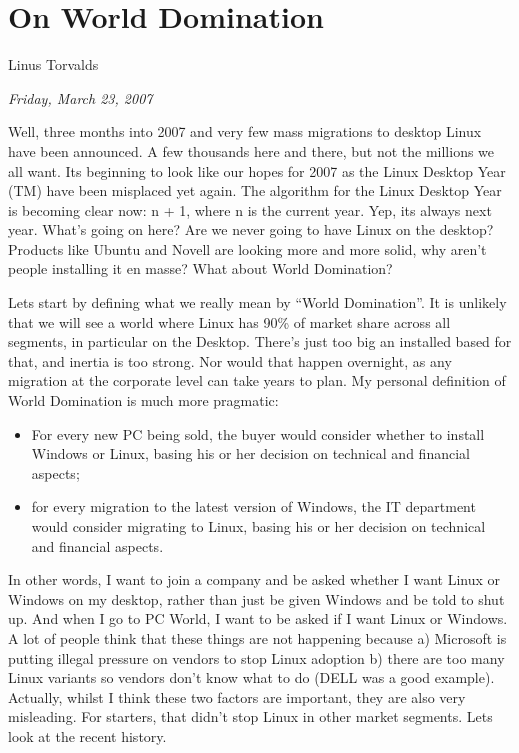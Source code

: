 \documentclass{memoir}
\begin{document}
\chapter{On World Domination}

\begin{epigraphs}
      {Linus Torvalds}
\end{epigraphs}

\begin{flushright}
  \emph{Friday, March 23, 2007 }
\end{flushright}

Well, three months into 2007 and very few mass migrations to desktop
Linux have been announced. A few thousands here and there, but not the
millions we all want. Its beginning to look like our hopes for 2007 as
the Linux Desktop Year (TM) have been misplaced yet again. The
algorithm for the Linux Desktop Year is becoming clear now: n + 1,
where n is the current year. Yep, its always next year. What's going
on here? Are we never going to have Linux on the desktop? Products
like Ubuntu and Novell are looking more and more solid, why aren't
people installing it en masse? What about World Domination?

Lets start by defining what we really mean by ``World Domination''. It
is unlikely that we will see a world where Linux has 90\% of market
share across all segments, in particular on the Desktop. There's just
too big an installed based for that, and inertia is too strong. Nor
would that happen overnight, as any migration at the corporate level
can take years to plan. My personal definition of World Domination is
much more pragmatic:

\begin{itemize}
\item For every new PC being sold, the buyer would consider whether to
  install Windows or Linux, basing his or her decision on technical
  and financial aspects;
\item for every migration to the latest version of Windows, the IT
  department would consider migrating to Linux, basing his or her
  decision on technical and financial aspects.
\end{itemize}

In other words, I want to join a company and be asked whether I want
Linux or Windows on my desktop, rather than just be given Windows and
be told to shut up. And when I go to PC World, I want to be asked if I
want Linux or Windows. A lot of people think that these things are not
happening because a) Microsoft is putting illegal pressure on vendors
to stop Linux adoption b) there are too many Linux variants so vendors
don't know what to do (DELL was a good example). Actually, whilst I
think these two factors are important, they are also very
misleading. For starters, that didn't stop Linux in other market
segments. Lets look at the recent history.
\end{document}
